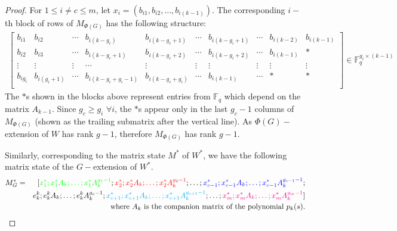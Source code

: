 \documentclass[letterpaper, 12 pt]{article}  \usepackage{amssymb}
\newcommand{\F}{\mathbb{F}}
\begin{document}
\begin{proof}
For $1\leq i\neq c \leq m$, let $x_i = (b_{i1},b_{i2}, \ldots,b_{i(k-1)})$.
The corresponding $i-$th block of rows of $M_{\Phi(G)}$ has the following
structure:
\begin{eqnarray*}
\left[ \begin{array}{cccc|cccccc}
  b_{i1} & b_{i2} & \cdots & b_{i(k-g_c)} &b_{i(k-g_c+1)} &\cdots&
b_{i(k-g_i+1)} & \cdots & b_{i(k-2)} & b_{i(k-1)}\\
  b_{i2} & b_{i3} & \cdots &b_{i(k-g_c+1)} & b_{i(k-g_c+2)} &
\cdots&b_{i(k-g_i+2)} &
\cdots & b_{i(k-1)} & *\\
  \vdots & \vdots & \vdots & \cdots & \vdots & \vdots & \vdots & \vdots&
\vdots&\vdots \\
  b_{ig_i} & b_{i(g_i+1)} & \cdots &b_{i(k-g_c+g_i-1)} & b_{i(k-g_c+g_i)}
&\cdots &
b_{i(k-1)} & \cdots & * & *\\
 \end{array}\right]\in \F_q^{g_i\times (k-1)}
\end{eqnarray*}
The $*$s shown in the blocks above represent entries from $\F_q$ which depend on
the matrix $A_{k-1}$. Since $g_c\geq g_i$ $\forall i$, the $*$s appear only in
the last $g_c-1$ columns of $M_{\Phi(G)}$ (shown as the trailing submatrix after the vertical line). As $\Phi(G)-$extension of $W$ has
rank $g-1$, therefore $M_{\Phi(G)}$ has rank $g-1$. 

Similarly, corresponding to the matrix state $M^*$ of $W^*$, we have the
following matrix state of the $G-$extension of $W^*$.
\begin{eqnarray*}
 M_{G}^* &=& [\textcolor{green}{x_1^*;x_1^*A_{k};\ldots;x_1^*A_{k}^{g_1-1}};
\textcolor{red}{x_2^*;x_2^*A_{k};\ldots;x_2^*A_{k}^{g_2-1}}; \ldots;
 \textcolor{blue}{x_{c-1}^*;x_{c-1}^*A_{k};\ldots;x_{c-1}^*A_{k}^{g_{c-1}-1}}
;\\&&
e_{k}^{k};e_{k}^{k}A_{k};\ldots;e_{k}^{k}A_{k}^{g_c-1}
;\textcolor {cyan} {
x_{c+1}^*;x_{c+1}^*A_{k};\ldots;x_{c+1}^*A_{k}^{g_{c+1}-1}};
\ldots;\textcolor{magenta}{
x_m^*;x_m^*A_{k};\ldots;x_m^*A_{k}^{g_m-1}}]\\
&& \textrm{where } A_{k} \textrm{ is the companion matrix of the polynomial
}p_{k}(s).
\end{eqnarray*}



\end{proof}
\end{document}
